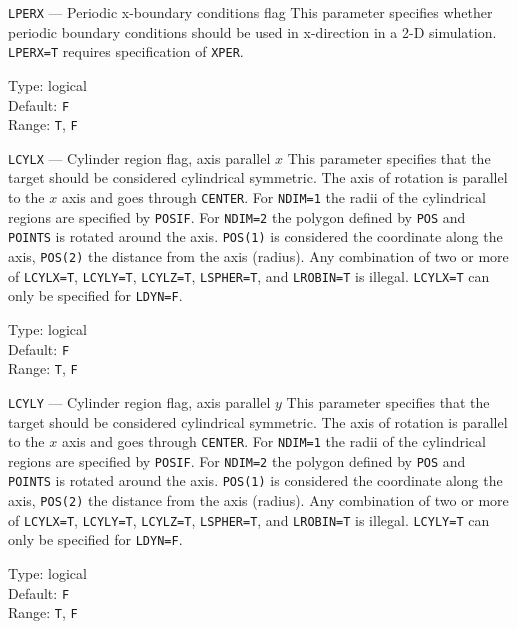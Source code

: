 \begin{keydescription}{\texttt{LPERX} --- Periodic x-boundary conditions flag}
%
  This parameter specifies whether periodic boundary conditions should be
  used in x-direction in a 2-D simulation. \texttt{LPERX=T} requires
  specification of \texttt{XPER}.
  \begin{keytab}
    Type:    \> logical \\
    Default: \> \texttt{F} \\
    Range:   \> \texttt{T}, \texttt{F} 
  \end{keytab}
\end{keydescription}

\begin{keydescription}{\texttt{LCYLX} --- Cylinder region flag, axis parallel $x$}
%
  This parameter specifies that the target should be considered cylindrical 
  symmetric. The axis of rotation is parallel to the $x$ axis and goes through 
  \texttt{CENTER}. For \texttt{NDIM=1} the radii of the 
  cylindrical regions are specified by \texttt{POSIF}. For \texttt{NDIM=2}
  the polygon defined by \texttt{POS} and \texttt{POINTS} is rotated around 
  the axis. \texttt{POS(1)} is considered the coordinate along the axis, 
  \texttt{POS(2)} the distance from the axis (radius). Any combination of two
  or more of \texttt{LCYLX=T}, \texttt{LCYLY=T}, \texttt{LCYLZ=T}, 
  \texttt{LSPHER=T}, and \texttt{LROBIN=T} is illegal. \texttt{LCYLX=T} can 
  only be specified for \texttt{LDYN=F}.
  \begin{keytab}
    Type:    \> logical \\
    Default: \> \texttt{F} \\
    Range:   \> \texttt{T}, \texttt{F} 
  \end{keytab}
\end{keydescription}

\begin{keydescription}{\texttt{LCYLY} --- Cylinder region flag, axis parallel $y$}
%
  This parameter specifies that the target should be considered cylindrical 
  symmetric. The axis of rotation is parallel to the $x$ axis and goes through 
  \texttt{CENTER}. For \texttt{NDIM=1} the radii of the 
  cylindrical regions are specified by \texttt{POSIF}. For \texttt{NDIM=2}
  the polygon defined by \texttt{POS} and \texttt{POINTS} is rotated around 
  the axis. \texttt{POS(1)} is considered the coordinate along the axis, 
  \texttt{POS(2)} the distance from the axis (radius). Any combination of two
  or more of \texttt{LCYLX=T}, \texttt{LCYLY=T}, \texttt{LCYLZ=T}, 
  \texttt{LSPHER=T}, and \texttt{LROBIN=T} is illegal. 
  \texttt{LCYLY=T} can only be specified for \texttt{LDYN=F}.
  \begin{keytab}
    Type:    \> logical \\
    Default: \> \texttt{F} \\
    Range:   \> \texttt{T}, \texttt{F} 
  \end{keytab}
\end{keydescription}

